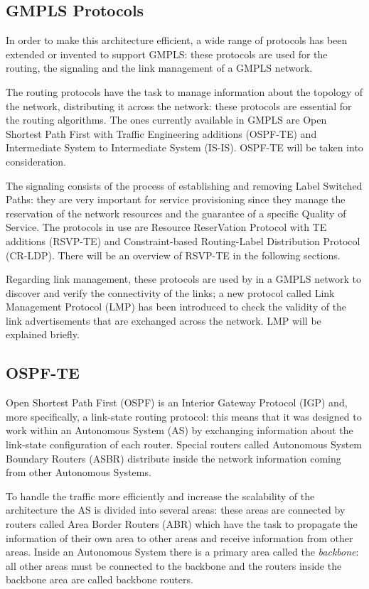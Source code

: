 \documentclass[10pt,a4paper]{report}
\begin{document}
\subsection{GMPLS Protocols}

In order to make this architecture efficient, a wide range of
protocols has been extended or invented to support GMPLS: these
protocols are used for the routing, the signaling and the link
management of a GMPLS network.

The routing protocols have the task to manage information about the
topology of the network, distributing it across the network: these
protocols are essential for the routing algorithms. The ones currently
available in GMPLS are Open Shortest Path First with Traffic
Engineering additions (OSPF-TE) and Intermediate System to
Intermediate System (IS-IS). OSPF-TE will be taken into consideration.

The signaling consists of the process of establishing and removing
Label Switched Paths: they are very important for service provisioning
since they manage the reservation of the network resources and the
guarantee of a specific Quality of Service. The protocols in use are
Resource ReserVation Protocol with TE additions (RSVP-TE) and
Constraint-based Routing-Label Distribution Protocol (CR-LDP). There
will be an overview of RSVP-TE in the following sections.

Regarding link management, these protocols are used by in a GMPLS
network to discover and verify the connectivity of the links; a new
protocol called Link Management Protocol (LMP) has been introduced to
check the validity of the link advertisements that are exchanged
across the network. LMP will be explained briefly.

\subsection{OSPF-TE}

Open Shortest Path First (OSPF) is an Interior Gateway Protocol (IGP)
and, more specifically, a link-state routing protocol: this means that
it was designed to work within an Autonomous System (AS) by exchanging
information about the link-state configuration of each router. Special
routers called Autonomous System Boundary Routers (ASBR) distribute
inside the network information coming from other Autonomous Systems.

To handle the traffic more efficiently and increase the scalability of
the architecture the AS is divided into several areas: these areas are
connected by routers called Area Border Routers (ABR) which have the
task to propagate the information of their own area to other areas and
receive information from other areas. Inside an Autonomous System
there is a primary area called the \textit{backbone}: all other areas
must be connected to the backbone and the routers inside the backbone
area are called backbone routers.
\end{document}
